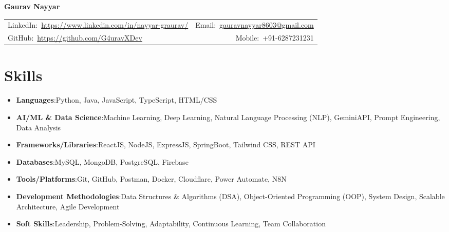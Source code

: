 \documentclass[10pt, a4paper]{article}
\begin{document}
{\color{headingblue}\bfseries\fontsize{18pt}{22pt}\selectfont Gaurav Nayyar}\par
\vspace{3pt}
\begin{tabularx}{\linewidth}{@{}X@{}r@{}}
  {\fontsize{8.5pt}{10pt}\selectfont LinkedIn:~\href{https://www.linkedin.com/in/nayyar-gaurav/}{https://www.linkedin.com/in/nayyar-graurav/}} &
  {\fontsize{8.5pt}{10pt}\selectfont Email:~\href{mailto:gauravnayyar8603@gmail.com}{gauravnayyar8603@gmail.com}} \\[1pt]
  {\fontsize{8.5pt}{10pt}\selectfont GitHub:~\href{https://github.com/G4uravXDev}{https://github.com/G4uravXDev}} &
  {\fontsize{8.5pt}{10pt}\selectfont Mobile:~+91-6287231231}
\end{tabularx}

\section{Skills}
\begin{itemize}
  \item {\color{headingblue}\bfseries Languages}:\enspace Python, Java, JavaScript, TypeScript, HTML/CSS
  \item {\color{headingblue}\bfseries AI/ML & Data Science}:\enspace Machine Learning, Deep Learning, Natural Language Processing (NLP), GeminiAPI, Prompt Engineering, Data Analysis
  \item {\color{headingblue}\bfseries Frameworks/Libraries}:\enspace ReactJS, NodeJS, ExpressJS, SpringBoot, Tailwind CSS, REST API
  \item {\color{headingblue}\bfseries Databases}:\enspace MySQL, MongoDB, PostgreSQL, Firebase
  \item {\color{headingblue}\bfseries Tools/Platforms}:\enspace Git, GitHub, Postman, Docker, Cloudflare, Power Automate, N8N
  \item {\color{headingblue}\bfseries Development Methodologies}:\enspace Data Structures & Algorithms (DSA), Object-Oriented Programming (OOP), System Design, Scalable Architecture, Agile Development
  \item {\color{headingblue}\bfseries Soft Skills}:\enspace Leadership, Problem-Solving, Adaptability, Continuous Learning, Team Collaboration
\end{itemize}

\end{document}
